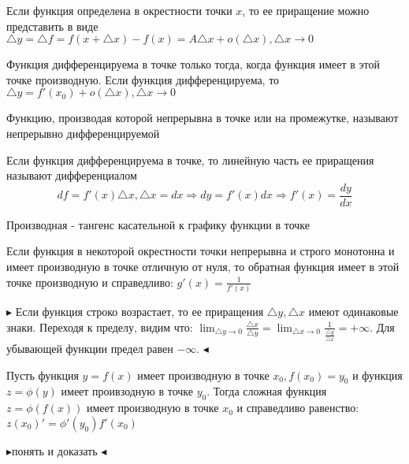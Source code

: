 \documentclass[14pt]{extreport}
\begin{document}
    \begin{definition}
        Если функция определена в окрестности точки $x$, то ее приращение можно представить в виде $\triangle y = \triangle f = f(x+ \triangle x) - f(x) = A\triangle x + o(\triangle x), \triangle x \rightarrow 0$
    \end{definition}

    \begin{theorem}
        Функция дифференцируема в точке только тогда, когда функция имеет в этой точке производную. Если функция дифференцируема, то $\triangle y = f'(x_0) + o(\triangle x), \triangle x \rightarrow 0$
    \end{theorem}

    \begin{definition}
        Функцию, производая которой непрерывна в точке или на промежутке, называют непрерывно дифференцируемой 
    \end{definition}

    \begin{definition}[Дифференциал]
        Если функция дифференцируема в точке, то линейную часть ее приращения называют дифференциалом
        $$df = f'(x)\triangle x, \triangle x = dx \Rightarrow dy=f'(x)dx \Rightarrow f'(x)=\frac{dy}{dx}$$
    \end{definition}

    \begin{definition}
        Производная - тангенс касательной к графику функции в точке
    \end{definition}

    \begin{theorem}
        Если функция в некоторой окрестности точки непрерывна и строго монотонна и имеет производную в точке отличную от нуля, то обратная функция имеет в этой точке производную и справедливо: $g'(x) = \frac{1}{f'(x)}$
    \end{theorem}

    $\blacktriangleright$
        Если функция строко возрастает, то ее приращения $\triangle y, \triangle x$ имеют одинаковые знаки. Переходя к пределу, видим что: $\lim_{\triangle y \rightarrow 0} \frac{\triangle x}{\triangle y} = \lim_{\triangle x \rightarrow 0} \frac{1}{\frac{\triangle y}{\triangle x} } =+ \infty$. Для убывающей функции предел равен $-\infty$. 
    $\blacktriangleleft$

    \begin{theorem}
        Пусть функция $y=f(x)$ имеет производную в точке $x_0, f(x_0) = y_0$ и функция $z=\phi(y)$ имеет проивзодную в точке $y_0$. Тогда сложная функция $z = \phi(f(x))$ имеет производную в точке $x_0$ и справедливо равенство: $z(x_0)' = \phi'(y_0)f'(x_0)$
    \end{theorem}
    $\blacktriangleright$понять и доказать $\blacktriangleleft$
\end{document}

